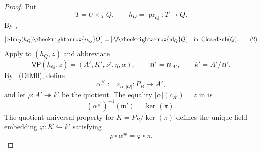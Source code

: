 \begin{proof}
  Put
  \[
    T=U\times_XQ,\qquad h_Q=\operatorname{pr}_Q\colon T\to Q.
  \]
  By ,
  \[
    [\,\operatorname{SIm}_Q(h_Q)\xhookrightarrow{i_{h_Q}}Q\,]
      =[\,Q\xhookrightarrow{\operatorname{id}_Q}Q\,]
      \quad\text{in }\operatorname{ClosedSub}(Q).               \tag{2}
  \]
  Apply  to $(h_Q,z)$ and abbreviate
  \[
    \mathsf{VP}(h_Q,z)=(A',K',\nu',\eta,\alpha),
    \qquad
    \mathfrak m'=\mathfrak m_{A'},
    \qquad k'=A'/\mathfrak m'.
  \]
  By ~(DIM0), define
  \[
    \alpha^\#:=\varepsilon_{\alpha,|Q|}\colon P_B\to A',
  \]
  and let
  $\rho\colon A'\twoheadrightarrow k'$ be the quotient.  The equality
  $|\alpha|(c_{A'})=z$ in
   is
  \[
    (\alpha^\#)^{-1}(\mathfrak m')=\ker(\pi).
  \]
  The quotient universal property for
  $K=P_B/\ker(\pi)$ defines the unique field embedding
  $\varphi\colon K\hookrightarrow k'$ satisfying
  \[
    \rho\circ\alpha^\#=\varphi\circ\pi.                       \tag{3}
  \]


\end{proof}
